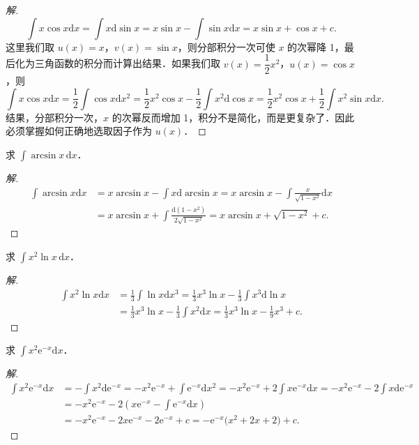 \begin{proof}[解]
\[
\int x\cos x\mathrm{d}x = \int x\mathrm{d}\sin x = x\sin x-\int\sin x\mathrm{d}x = x\sin x+\cos x+c.
\]
这里我们取 $u(x) = x$，$v(x) = \sin x$，则分部积分一次可使 $x$ 的次幂降 1，最后化为三角函数的积分而计算出结果．如果我们取 $v(x) = \dfrac{1}{2}x^{2}$，$u(x) = \cos x$，则
\[
\int x\cos x\mathrm{d}x = \frac{1}{2}\int\cos x\mathrm{d}x^{2}
= \frac{1}{2}x^{2}\cos x-\frac{1}{2}\int x^{2}\mathrm{d}\cos x
= \frac{1}{2}x^{2}\cos x+\frac{1}{2}\int x^{2}\sin x\mathrm{d}x.
\]
结果，分部积分一次，$x$ 的次幂反而增加 1，积分不是简化，而是更复杂了．因此必须掌握如何正确地选取因子作为 $u(x)$．
\end{proof}

\begin{example}\label{ex:6-2-14}
求 $\displaystyle\int\arcsin x\,\mathrm{d}x$．
\end{example}

\begin{proof}[解]
\[
\begin{aligned}
\int\arcsin x\mathrm{d}x
&= x\arcsin x-\int x\mathrm{d}\arcsin x
= x\arcsin x-\int\frac{x}{\sqrt{1-x^{2}}}\mathrm{d}x\\
&= x\arcsin x+\int\frac{\mathrm{d}(1-x^{2})}{2\sqrt{1-x^{2}}}
= x\arcsin x+\sqrt{1-x^{2}}+c.
\end{aligned}
\]
\end{proof}

\begin{example}\label{ex:6-2-15}
求 $\displaystyle\int x^{2}\ln x\,\mathrm{d}x$．
\end{example}

\begin{proof}[解]
\[
\begin{aligned}
\int x^{2}\ln x\mathrm{d}x
&= \frac{1}{3}\int\ln x\mathrm{d}x^{3}
= \frac{1}{3}x^{3}\ln x-\frac{1}{3}\int x^{3}\mathrm{d}\ln x\\
&= \frac{1}{3}x^{3}\ln x-\frac{1}{3}\int x^{2}\mathrm{d}x
= \frac{1}{3}x^{3}\ln x-\frac{1}{9}x^{3}+c.
\end{aligned}
\]
\end{proof}

\begin{example}\label{ex:6-2-16}
求 $\displaystyle\int x^{2}\mathrm{e}^{-x}\mathrm{d}x$．
\end{example}

\begin{proof}[解]
\[
\begin{aligned}
\int x^{2}\mathrm{e}^{-x}\mathrm{d}x
&= -\int x^{2}\mathrm{d}\mathrm{e}^{-x}
= -x^{2}\mathrm{e}^{-x}+\int\mathrm{e}^{-x}\mathrm{d}x^{2}
= -x^{2}\mathrm{e}^{-x}+2\int x\mathrm{e}^{-x}\mathrm{d}x
= -x^{2}\mathrm{e}^{-x}-2\int x\mathrm{d}\mathrm{e}^{-x}\\
&= -x^{2}\mathrm{e}^{-x}-2\left(x\mathrm{e}^{-x}-\int\mathrm{e}^{-x}\mathrm{d}x\right)\\
&= -x^{2}\mathrm{e}^{-x}-2x\mathrm{e}^{-x}-2\mathrm{e}^{-x}+c
= -\mathrm{e}^{-x}\big(x^{2}+2x+2\big)+c.
\end{aligned}
\]
\end{proof}

